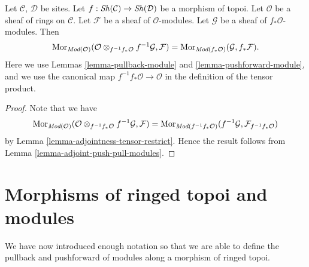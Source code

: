 \begin{lemma}
\label{lemma-adjoint-pull-push-modules}
Let $\mathcal{C}$, $\mathcal{D}$ be sites.
Let $f : \mathop{\mathit{Sh}}\nolimits(\mathcal{C}) \to \mathop{\mathit{Sh}}\nolimits(\mathcal{D})$
be a morphism of topoi.
Let $\mathcal{O}$ be a sheaf of rings on $\mathcal{C}$.
Let $\mathcal{F}$ be a sheaf of $\mathcal{O}$-modules.
Let $\mathcal{G}$ be a sheaf of $f_*\mathcal{O}$-modules.
Then
$$
\mathop{\mathrm{Mor}}\nolimits_{\textit{Mod}(\mathcal{O})}(
\mathcal{O} \otimes_{f^{-1}f_*\mathcal{O}} f^{-1}\mathcal{G}, \mathcal{F})
=
\mathop{\mathrm{Mor}}\nolimits_{\textit{Mod}(f_*\mathcal{O})}(\mathcal{G}, f_*\mathcal{F}).
$$
Here we use
Lemmas \ref{lemma-pullback-module}
and \ref{lemma-pushforward-module}, and we use
the canonical map $f^{-1}f_*\mathcal{O} \to \mathcal{O}$
in the definition of the tensor product.
\end{lemma}

\begin{proof}
Note that we have
$$
\mathop{\mathrm{Mor}}\nolimits_{\textit{Mod}(\mathcal{O})}(
\mathcal{O} \otimes_{f^{-1}f_*\mathcal{O}} f^{-1}\mathcal{G}, \mathcal{F})
=
\mathop{\mathrm{Mor}}\nolimits_{\textit{Mod}(f^{-1}f_*\mathcal{O})}(
f^{-1}\mathcal{G}, \mathcal{F}_{f^{-1}f_*\mathcal{O}})
$$
by Lemma \ref{lemma-adjointness-tensor-restrict}. Hence the result follows
from Lemma \ref{lemma-adjoint-push-pull-modules}.
\end{proof}






\section{Morphisms of ringed topoi and modules}
\label{section-functoriality-modules}

\noindent
We have now introduced enough notation so that we are able to
define the pullback and pushforward of modules along a morphism
of ringed topoi.

